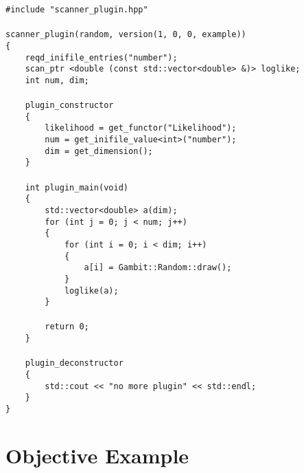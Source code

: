 \documentclass[11pt,a4paper]{article}
\newcommand{\tab}{${}$\ \ \ \ }
\begin{document}
\begin{linenumbers}
\texttt{\#include "scanner\_plugin.hpp"\\
\\
scanner\_plugin(random, version(1, 0, 0, example))\\
\{\\
\tab reqd\_inifile\_entries("number");\\
\tab scan\_ptr <double (const std::vector<double> \&)> loglike;
\\
\tab int num, dim;\\
\\
\tab plugin\_constructor\\
\tab \{\\
\tab \tab likelihood = get\_functor("Likelihood");\\
\tab \tab num = get\_inifile\_value<int>("number");\\
\tab \tab dim = get\_dimension();\\
\tab \}\\
\\
\tab int plugin\_main(void)\\
\tab \{\\
\tab \tab std::vector<double> a(dim);\\
\tab \tab for (int j = 0; j < num; j++)\\
\tab \tab \{\\
\tab \tab \tab for (int i = 0; i < dim; i++)\\
\tab \tab \tab \{\\
\tab \tab \tab \tab a[i] = Gambit::Random::draw();\\
\tab \tab \tab \}\\
\tab \tab \tab loglike(a);\\
\tab \tab \}\\
\\
\tab \tab return 0;\\
\tab \}\\
\\
\tab plugin\_deconstructor\\
\tab \{\\
\tab \tab std::cout << "no more plugin" << std::endl;\\
\tab \}\\
\}}
\end{linenumbers}

\section{Objective Example}
\end{document}
